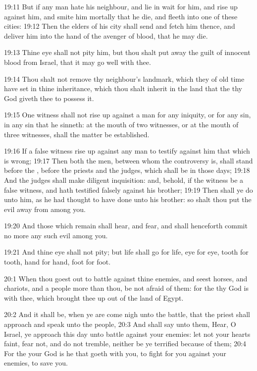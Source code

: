 19:11 But if any man hate his neighbour, and lie in wait for him, and
rise up against him, and smite him mortally that he die, and fleeth
into one of these cities: 19:12 Then the elders of his city shall send
and fetch him thence, and deliver him into the hand of the avenger of
blood, that he may die.

19:13 Thine eye shall not pity him, but thou shalt put away the guilt
of innocent blood from Israel, that it may go well with thee.

19:14 Thou shalt not remove thy neighbour's landmark, which they of
old time have set in thine inheritance, which thou shalt inherit in
the land that the \LORD thy God giveth thee to possess it.

19:15 One witness shall not rise up against a man for any iniquity, or
for any sin, in any sin that he sinneth: at the mouth of two
witnesses, or at the mouth of three witnesses, shall the matter be
established.

19:16 If a false witness rise up against any man to testify against
him that which is wrong; 19:17 Then both the men, between whom the
controversy is, shall stand before the \LORD, before the priests and
the judges, which shall be in those days; 19:18 And the judges shall
make diligent inquisition: and, behold, if the witness be a false
witness, and hath testified falsely against his brother; 19:19 Then
shall ye do unto him, as he had thought to have done unto his brother:
so shalt thou put the evil away from among you.

19:20 And those which remain shall hear, and fear, and shall
henceforth commit no more any such evil among you.

19:21 And thine eye shall not pity; but life shall go for life, eye
for eye, tooth for tooth, hand for hand, foot for foot.

20:1 When thou goest out to battle against thine enemies, and seest
horses, and chariots, and a people more than thou, be not afraid of
them: for the \LORD thy God is with thee, which brought thee up out of
the land of Egypt.

20:2 And it shall be, when ye are come nigh unto the battle, that the
priest shall approach and speak unto the people, 20:3 And shall say
unto them, Hear, O Israel, ye approach this day unto battle against
your enemies: let not your hearts faint, fear not, and do not tremble,
neither be ye terrified because of them; 20:4 For the \LORD your God is
he that goeth with you, to fight for you against your enemies, to save
you.

